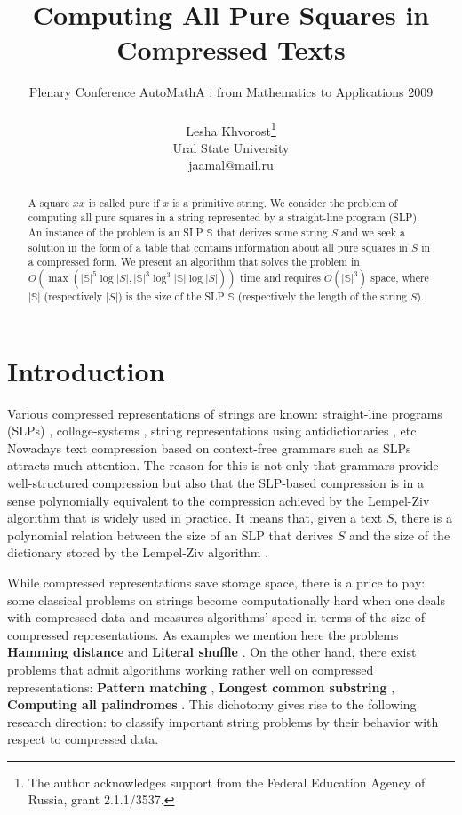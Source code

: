 \documentclass[11pt]{article}
\begin{document}
\title{Computing All Pure Squares in Compressed Texts}
\author{Plenary Conference AutoMathA : from Mathematics to Applications 2009\\ \\
Lesha Khvorost\thanks{The author acknowledges support from the Federal Education Agency of Russia,
grant  2.1.1/3537.}\\
Ural State University\\
jaamal@mail.ru}
\date{}
\maketitle

\begin{abstract}
A square $xx$ is called pure if $x$ is a primitive string. We
consider the problem of computing all pure squares in a string
represented by a straight-line program (SLP). An instance of the
problem is an SLP $\mathbb{S}$ that derives some string $S$ and we
seek a solution in the form of a table that contains information
about all pure squares in $S$ in a compressed form. We present an
algorithm that solves the problem in $O(\max(|\mathbb{S}|^5\log|S|,
|\mathbb{S}|^3\log^3|\mathbb{S}|\log|S|))$ time and requires
$O(|\mathbb{S}|^3)$ space, where $|\mathbb{S}|$ (respectively
$|S|$) is the size of the SLP $\mathbb{S}$ (respectively the
length of the string $S$).
\end{abstract}

\section{Introduction}

Various compressed representations of strings are known:
straight-line programs (SLPs) \cite{14,15,16,18}, collage-systems
\cite{12}, string representations using antidictionaries \cite{13},
etc. Nowadays text compression based on context-free grammars such
as SLPs attracts much attention. The reason for this is not only
that grammars provide well-structured compression but also that
the SLP-based compression is in a sense polynomially equivalent
to the compression achieved by the Lempel-Ziv algorithm that
is widely used in practice. It means that, given a text $S$,
there is a polynomial relation between the size of an SLP that
derives $S$ and the size of the dictionary stored by
the Lempel-Ziv algorithm \cite{18}.

While compressed representations save storage space, there is a
price to pay: some classical problems on strings become
computationally hard when one deals with compressed data and
measures algorithms' speed in terms of the size of compressed
representations. As examples we mention here the problems {\bf
Hamming distance} \cite{15} and {\bf Literal shuffle} \cite{4}. On
the other hand, there exist problems that admit algorithms working
rather well on compressed representations: {\bf Pattern matching}
\cite{15, 10}, {\bf Longest common substring} \cite{16}, {\bf
Computing all palindromes} \cite{16}. This dichotomy gives rise to
the following research direction: to classify important string
problems by their behavior with respect to compressed data.
\end{document}
